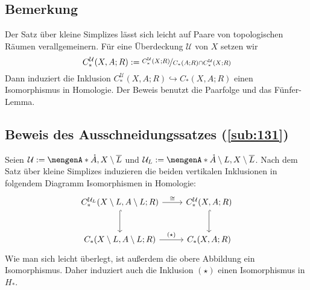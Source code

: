 \subsection[Bemerkung: Satz über kleine Simplizes für Paare von topologischen Räumen]{Bemerkung} %
\label{sub:134}
Der Satz über kleine Simplizes lässt sich leicht auf Paare von topologischen Räumen verallgemeinern. Für eine Überdeckung $\mathcal{U}$ von $X$ setzen wir 
\[
	C_*^\mathcal{U} \enbrace*{X,A;R} := \nicefrac{C_*^\mathcal{U}(X;R)}{C_*(A;R) \cap C_*^\mathcal{U}(X;R)} 
\]
Dann induziert die Inklusion $C_*^\mathcal{U}(X,A;R) \hookrightarrow C_*(X,A;R)$ einen Isomorphismus in Homologie. Der Beweis benutzt die Paarfolge und das Fünfer-Lemma.

\subsection{Beweis des Ausschneidungssatzes (\ref{sub:131})} %
\label{sub:135}
Seien $\mathcal{U} := \set{\mathring{A},X \setminus \overline{L}}$ und $\mathcal{U}_L := \set{\mathring{A} \setminus L, X \setminus \overline{L}}$. Nach
dem Satz über kleine Simplizes induzieren die beiden vertikalen Inklusionen in folgendem Diagramm Isomorphismen in Homologie:
\[
	\begin{tikzcd}[row sep=large]
		C_*^{\mathcal{U}_L} \enbrace*{X \setminus L, A \setminus L;R} \rar["\cong"] \dar[hook]
		& C_*^\mathcal{U}(X,A;R) \dar[hook] \\
		C_*(X \setminus L, A \setminus L;R) \rar["(\star)"] & C_*(X,A;R)
	\end{tikzcd}
\]
Wie man sich leicht überlegt, ist außerdem die obere Abbildung ein Isomorphismus.
Daher induziert auch die Inklusion $(\star)$ einen Isomorphismus in $H_*$. \bewende

